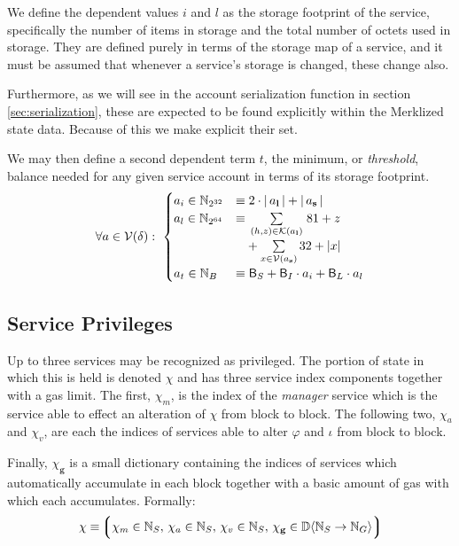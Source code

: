 We define the dependent values $i$ and $l$ as the storage footprint of the service, specifically the number of items in storage and the total number of octets used in storage. They are defined purely in terms of the storage map of a service, and it must be assumed that whenever a service's storage is changed, these change also.

Furthermore, as we will see in the account serialization function in section \ref{sec:serialization}, these are expected to be found explicitly within the Merklized state data. Because of this we make explicit their set.

We may then define a second dependent term $t$, the minimum, or \emph{threshold}, balance needed for any given service account in terms of its storage footprint.
\begin{align}
  \forall a \in \mathcal{V}(\delta):\ \begin{cases}
    a_i \in \mathbb{N}_{2^{32}} &\equiv 2\cdot|\,a_\mathbf{l}\,| + |\,a_\mathbf{s}\,| \\
    a_l \in \mathbb{N}_{2^{64}} &\equiv \sum\limits_{\,(h, z) \in \mathcal{K}(a_\mathbf{l})\,} 81 + z \\
    &\phantom{\equiv} + \sum\limits_{x \in \mathcal{V}(a_\mathbf{s})} 32 + |x| \\
    a_t \in \mathbb{N}_B &\equiv \mathsf{B}_S + \mathsf{B}_I \cdot a_i + \mathsf{B}_L \cdot a_l
  \end{cases}
\end{align}





\subsection{Service Privileges}
Up to three services may be recognized as privileged. The portion of state in which this is held is denoted $\chi$ and has three service index components together with a gas limit. The first, $\chi_m$, is the index of the \emph{manager} service which is the service able to effect an alteration of $\chi$ from block to block. The following two, $\chi_a$ and $\chi_v$, are each the indices of services able to alter $\varphi$ and $\iota$ from block to block.

Finally, $\chi_\mathbf{g}$ is a small dictionary containing the indices of services which automatically accumulate in each block together with a basic amount of gas with which each accumulates. Formally:
\begin{align}
  \chi \equiv \tuple{
    \isa{\chi_m}{\N_S} \ts
    \isa{\chi_a}{\N_S} \ts
    \isa{\chi_v}{\N_S} \ts
    \isa{\chi_\mathbf{g}}{\dict{\N_S}{\N_G}}
  }
\end{align}
